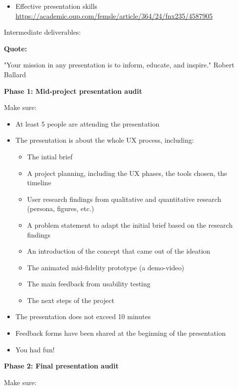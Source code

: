 \begin{itemize}
\item Effective presentation skills \url{https://academic.oup.com/femsle/article/364/24/fnx235/4587905}
\end{itemize}

Intermediate deliverables:

\textbf{Quote:}

"Your mission in any presentation is to inform, educate, and inspire." Robert Ballard

\medskip

\textbf{Phase 1: Mid-project presentation audit}

Make sure:

\begin{itemize}
\item At least 5 people are attending the presentation
\item The presentation is about the whole UX process, including:
\begin{itemize}
\item The intial brief
\item A project planning, including the UX phases, the tools chosen, the timeline
\item User research findings from qualitative and quantitative research (persona, figures, etc.)
\item A problem statement to adapt the initial brief based on the research findings
\item An introduction of the concept that came out of the ideation
\item The animated mid-fidelity prototype (a demo-video)
\item The main feedback from usability testing
\item The next steps of the project
\end{itemize}
\item The presentation does not exceed 10 minutes
\item Feedback forms have been shared at the beginning of the presentation
\item You had fun!
\end{itemize}

\medskip

\textbf{Phase 2: Final presentation audit}

Make sure:

